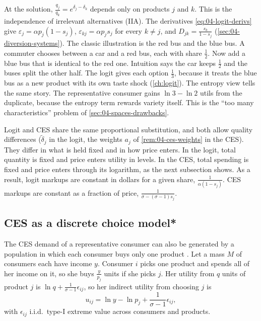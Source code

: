  At the solution, $\frac{q_j}{q_k} = e^{\delta_j - \delta_k}$ depends only on
products $j$ and $k$. This is the independence of irrelevant alternatives (IIA). The derivatives
\eqref{eq:04-logit-derivs} give $\varepsilon_j = \alpha p_j(1 - s_j)$, $\varepsilon_{kj} = \alpha p_js_j$ for every $k \ne j$,
and $D_{jk} = \frac{s_k}{1 - s_j}$ (\cref{sec:04-diversion-systems}). The classic illustration is the red bus and the
blue bus. A commuter chooses between a car and a red bus, each with share $\frac{1}{2}$. Now add a blue bus that
is identical to the red one. Intuition says the car keeps $\frac{1}{2}$ and the buses split the other half. The
logit gives each option $\frac{1}{3}$, because it treats the blue bus as a new product with its own taste shock
(\cref{ch:logit}). The entropy view tells the same story. The representative consumer gains $\ln 3 - \ln 2$ utils
from the duplicate, because the entropy term rewards variety itself. This is the ``too many characteristics''
problem of \cref{sec:04-spaces-drawbacks}.

Logit and CES share the same proportional substitution, and both allow quality differences ($\tilde\delta_j$ in
the logit, the weights $a_j$ of \cref{rem:04-ces-weights} in the CES). They differ in what is held fixed and in how
price enters. In the logit, total quantity is fixed and price enters utility in levels. In the CES, total spending
is fixed and price enters through its logarithm, as the next subsection shows. As a result, logit markups are
constant in dollars for a given share, $\frac{1}{\alpha(1 - s_j)}$. CES markups are constant as a fraction of price,
$\frac{1}{\sigma - (\sigma - 1)s_j}$.

\subsection{CES as a discrete choice model*}\label{sec:04-repcons-cesdc}

The CES demand of a representative consumer can also be generated by a population in which each consumer buys only
one product \citep{AndersonDePalmaThisse1987}. Let a mass $M$ of consumers each have income $y$. Consumer $i$ picks
one product and spends all of her income on it, so she buys $\frac{y}{p_j}$ units if she picks $j$. Her utility from
$q$ units of product $j$ is $\ln q + \frac{1}{\sigma - 1}\epsilon_{ij}$, so her indirect utility from choosing $j$ is
\begin{equation}\label{eq:04-ces-rum}
u_{ij} = \ln y - \ln p_j + \frac{1}{\sigma - 1}\epsilon_{ij},
\end{equation}
with $\epsilon_{ij}$ i.i.d.\ type-I extreme value across consumers and products.

